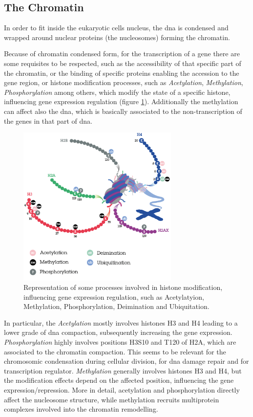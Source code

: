 \subsection{The Chromatin}
\label{sec:chromatin}
In order to fit inside the eukaryotic cells nucleus, the \gls{dna} is condensed and wrapped around nuclear proteins (the nucleosomes) forming the chromatin.

Because of chromatin condensed form, for the transcription of a gene there are some requisites to be respected, such as the accessibility of that specific part of the chromatin, or the binding of specific proteins enabling the accession to the gene region, or histone modification processes, such as \textit{Acetylation}, \textit{Methylation}, \textit{Phosphorylation} among others, which modify the state of a specific histone, influencing gene expression regulation (figure \ref{fig:histmod}).  
Additionally the methylation can affect also the \gls{dna}, which is basically associated to the non-transcription of the genes in that part of \gls{dna}.

\begin{figure}[h]
\centering
\includegraphics[width=8cm, keepaspectratio]{img/intro/hm.png}
\caption[Histon modification]{Representation of some processes involved in histone modification, influencing gene expression regulation, such as Acetylatyion, Methylation, Phosphorylation, Deimination and Ubiquitation.}
\label{fig:histmod}
\end{figure}


In particular, the \textit{Acetylation} mostly involves histones H3 and H4 leading to a lower grade of \gls{dna} compaction, subsequently increasing the gene expression.
\textit{Phosphorylation} highly involves positions H3S10 and T120 of H2A, which are associated to the chromatin compaction.
This seems to be relevant for the chromosomic condensation during cellular division, for \gls{dna} damage repair and for transcription regulator.
\textit{Methylation} generally involves histones H3 and H4, but the modification effects depend on the affected position, influencing the gene expression/repression.
More in detail, acetylation and phosphorylation directly affect the nucleosome structure, while methylation recruits multiprotein complexes involved into the chromatin remodelling.

